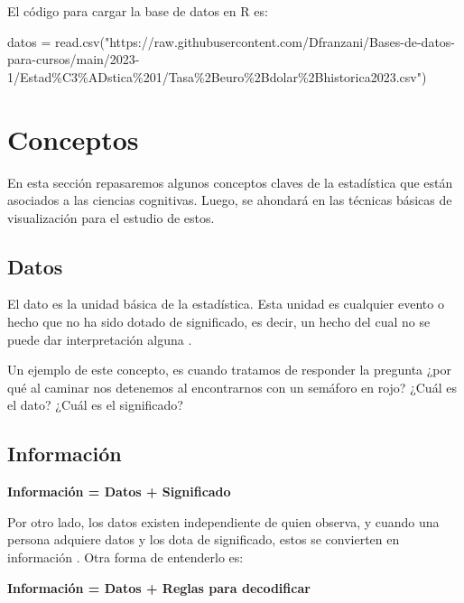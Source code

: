 \documentclass[
]{book}
\newenvironment{Shaded}{\begin{snugshade}}{\end{snugshade}}
\newcommand{\FunctionTok}[1]{\textcolor[rgb]{0.00,0.00,0.00}{#1}}
\newcommand{\NormalTok}[1]{#1}
\newcommand{\OtherTok}[1]{\textcolor[rgb]{0.56,0.35,0.01}{#1}}
\newcommand{\StringTok}[1]{\textcolor[rgb]{0.31,0.60,0.02}{#1}}
\begin{document}
El código para cargar la base de datos en R es:

\begin{Shaded}
\begin{Highlighting}[]
\NormalTok{datos }\OtherTok{=} \FunctionTok{read.csv}\NormalTok{(}\StringTok{"https://raw.githubusercontent.com/Dfranzani/Bases{-}de{-}datos{-}para{-}cursos/main/2023{-}1/Estad\%C3\%ADstica\%201/Tasa\%2Beuro\%2Bdolar\%2Bhistorica2023.csv"}\NormalTok{)}
\end{Highlighting}
\end{Shaded}

\hypertarget{conceptos}{%
\section{Conceptos}\label{conceptos}}

En esta sección repasaremos algunos conceptos claves de la estadística que están asociados a las ciencias cognitivas. Luego, se ahondará en las técnicas básicas de visualización para el estudio de estos.

\hypertarget{datos}{%
\subsection{Datos}\label{datos}}

El dato es la unidad básica de la estadística. Esta unidad es cualquier evento o hecho que no ha sido dotado de significado, es decir, un hecho del cual no se puede dar interpretación alguna \citep{brachman_knowledge_2004}.

Un ejemplo de este concepto, es cuando tratamos de responder la pregunta ¿por qué al caminar nos detenemos al encontrarnos con un semáforo en rojo? ¿Cuál es el dato? ¿Cuál es el significado?

\hypertarget{informaciuxf3n}{%
\subsection{Información}\label{informaciuxf3n}}

\textbf{Información = Datos + Significado}

Por otro lado, los datos existen independiente de quien observa, y cuando una persona adquiere datos y los dota de significado, estos se convierten en información \citep{brachman_knowledge_2004}. Otra forma de entenderlo es:

\textbf{Información = Datos + Reglas para decodificar}
\end{document}
